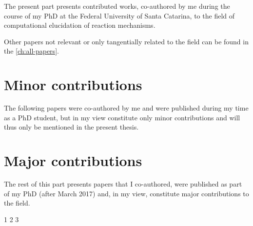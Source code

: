 The present part presents contributed works,
co-authored by me during the course of my PhD
at the Federal University of Santa Catarina,
to the field of computational elucidation of reaction mechanisms.

Other papers
not relevant or only tangentially related to the field
can be found in the \autoref{ch:all-papers}.

\section{Minor contributions}%
\label{sec:minor-contributions}
The following papers were co-authored by me and were published
during my time as a PhD student,
but in my view constitute only minor contributions and
will thus only be mentioned in the present thesis.


\section{Major contributions}%
\label{sec:major-contributions}
The rest of this part presents papers that I co-authored, were published as
part of my PhD (after March 2017) and, in my view, constitute major contributions
to the field.

{1}
{2}
{3}
